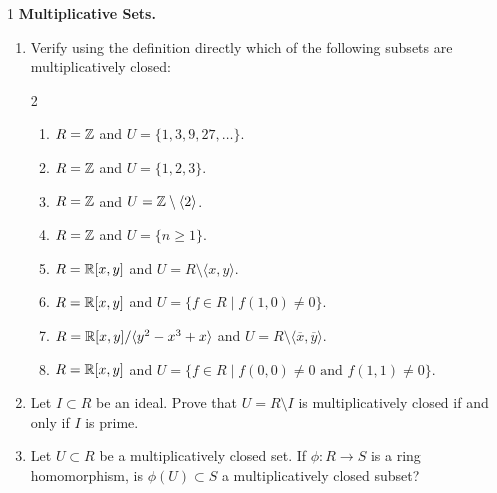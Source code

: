 \documentclass[Notebook.tex]{subfiles}
\begin{document}
\begin{problem}{1}
	\textbf{Multiplicative Sets.}
		
	\begin{enumerate}	
		\item Verify using the definition directly which of the following subsets are multiplicatively closed:
		\begin{multicols}{2}
		\begin{enumerate}
			\item $R = \mathbb Z$ and $U = \{1, 3, 9, 27, \ldots\}$.
			\item $R = \mathbb Z$ and $U = \{1, 2, 3\}$.
			\item $R=\mathbb Z$ and $U=\mathbb Z \setminus\langle 2 \rangle$.
			\item $R=\mathbb Z$ and $U=\{n {\geq 1}\}$.
			\item $R=\mathbb R[x,y]$ and $U=R\setminus\langle x,y\rangle$.
			\item $R=\mathbb R[x,y]$ and $U = \{f \in R \mid f(1,0) \neq 0\}$.
			\item $R=\mathbb R[x,y]/\langle y^2-x^3+x\rangle$ and $U=R\setminus\langle \overline{x}, \overline{y} \rangle$.
			\item $R=\mathbb R[x,y]$ and $U = \{f \in R \mid f(0,0) \neq 0 \text{ and } f(1,1) \neq 0\}$.
		\end{enumerate}
		\end{multicols}
		\item\label{ex-pt:prime-mult-set} Let $I \subset R$ be an ideal. Prove that $U=R\setminus I$ is multiplicatively closed if and only if $I$ is prime. 
		\item Let $U \subset R$ be a multiplicatively closed set. If $\phi:R\to S$ is a ring homomorphism, is $\phi(U) \subset S$ a multiplicatively closed subset?
	\end{enumerate}
\end{problem}
\end{document}
